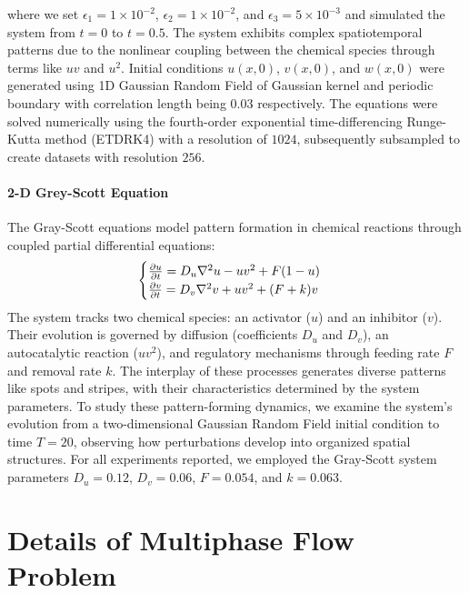where we set $\epsilon_1 = 1 \times 10^{-2}$, $\epsilon_2 = 1 \times 10^{-2}$, and $\epsilon_3 = 5 \times 10^{-3}$ and simulated the system from $t=0$ to $t=0.5$. The system exhibits complex spatiotemporal patterns due to the nonlinear coupling between the chemical species through terms like $uv$ and $u^2$. Initial conditions $u(x,0)$, $v(x,0)$, and $w(x,0)$ were generated using 1D Gaussian Random Field of Gaussian kernel and periodic boundary with correlation length being $0.03$ respectively. The equations were solved numerically using the fourth-order exponential time-differencing Runge-Kutta method (ETDRK4) with a resolution of $1024$, subsequently subsampled to create datasets with resolution $256$. 


\paragraph{2-D Grey-Scott Equation} The Gray-Scott equations model pattern formation in chemical reactions through coupled partial differential equations:
\begin{equation}
	\begin{cases}
		\frac{\partial u}{\partial t} = D_u\nabla^2 u - uv^2 + F(1-u) \notag \\
		\frac{\partial v}{\partial t} = D_v\nabla^2 v + uv^2 + (F+k)v \notag
	\end{cases}
\end{equation}
The system tracks two chemical species: an activator ($u$) and an inhibitor ($v$). Their evolution is governed by diffusion (coefficients $D_u$ and $D_v$), an autocatalytic reaction ($uv^2$), and regulatory mechanisms through feeding rate $F$ and removal rate $k$. The interplay of these processes generates diverse patterns like spots and stripes, with their characteristics determined by the system parameters.
To study these pattern-forming dynamics, we examine the system's evolution from a two-dimensional Gaussian Random Field initial condition to time $T=20$, observing how perturbations develop into organized spatial structures. For all experiments reported, we employed the Gray-Scott system parameters $D_u=0.12$, $D_v=0.06$, $F=0.054$, and $k=0.063$.


\newpage
\section{Details of Multiphase Flow Problem}
\label{sec:appx-mf}

